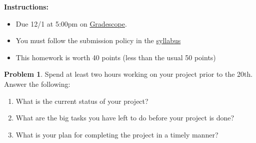 \documentclass[12pt]{article}
\theoremstyle{definition}
\newtheorem{problem}{Problem}
\begin{document}
\textbf{\Large{}}
    
    \vspace{-1.8em}
    \hrulefill
 
\textbf{Instructions:}
    \begin{itemize}
        \item Due 12/1 at 5:00pm on \href{https://www.gradescope.com/courses/570477/}{Gradescope}.
        \item You must follow the submission policy in the \href{https://courses.chen.pw/na_f2023/syllabus.html}{syllabus} 
        \item This homework is worth 40 points (less than the usual 50 points)
\end{itemize}
   
\vspace{.5em}


\begin{problem}
    Spend at least two hours working on your project prior to the 20th. 
    Answer the following:
    \begin{enumerate}
        \item What is the current status of your project? 
        \item What are the big tasks you have left to do before your project is done?
        \item What is your plan for completing the project in a timely manner?
    \end{enumerate}
\end{problem}
\end{document}
